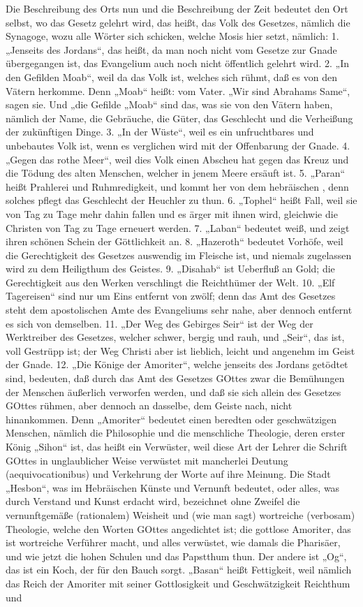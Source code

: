 Die Beschreibung des Orts nun und die Beschreibung der Zeit bedeutet den Ort selbst, wo das Gesetz gelehrt wird, das heißt, das Volk des Gesetzes, nämlich die Synagoge, wozu alle Wörter sich schicken, welche Mosis hier setzt, nämlich: 1. „Jenseits des Jordans“, das heißt, da man noch nicht vom Gesetze zur Gnade übergegangen ist, das Evangelium auch noch nicht öffentlich gelehrt wird. 2. „In den Gefilden Moab“, weil da das Volk ist, welches sich rühmt, daß es von den Vätern herkomme. Denn „Moab“ heißt: vom Vater. „Wir sind Abrahams Same“, sagen sie. Und „die Gefilde
„Moab“ sind das, was sie von den Vätern haben, nämlich der Name, die Gebräuche, die Güter, das Geschlecht und die Verheißung der zukünftigen Dinge. 3. „In der Wüste“, weil es ein unfruchtbares und unbebautes Volk ist, wenn es verglichen wird mit der Offenbarung der Gnade. 4. „Gegen das rothe Meer“, weil dies Volk einen Abscheu hat gegen das Kreuz und die Tödung des alten Menschen, welcher in jenem Meere ersäuft ist. 5. „Paran“ heißt Prahlerei und Ruhmredigkeit, und kommt her von dem hebräischen , denn solches pflegt das Geschlecht der Heuchler zu thun. 6. „Tophel“ heißt Fall, weil sie von Tag zu Tage mehr dahin fallen und es ärger mit ihnen wird, gleichwie die Christen von Tag zu Tage erneuert werden. 7. „Laban“ bedeutet weiß, und zeigt ihren schönen Schein der Göttlichkeit an. 8. „Hazeroth“ bedeutet Vorhöfe, weil die Gerechtigkeit des Gesetzes auswendig im Fleische ist, und niemals zugelassen wird zu dem Heiligthum des Geistes. 9. „Disahab“ ist Ueberfluß an Gold; die Gerechtigkeit aus den Werken verschlingt die Reichthümer der Welt. 10. „Elf Tagereisen“ sind nur um Eins entfernt von zwölf; denn das Amt des Gesetzes steht dem apostolischen Amte des Evangeliums sehr nahe, aber dennoch entfernt es sich von demselben. 11. „Der Weg des Gebirges Seir“ ist der Weg der Werktreiber des Gesetzes, welcher schwer, bergig und rauh, und „Seir“, das ist, voll Gestrüpp ist; der Weg Christi aber ist lieblich, leicht und angenehm im Geist der Gnade. 12. „Die Könige der Amoriter“, welche jenseits des Jordans getödtet sind, bedeuten, daß durch das Amt des Gesetzes GOttes zwar die Bemühungen der Menschen äußerlich verworfen werden, und daß sie sich allein des Gesetzes GOttes rühmen, aber dennoch an dasselbe, dem Geiste nach, nicht hinankommen. Denn „Amoriter“ bedeutet einen beredten oder geschwätzigen Menschen, nämlich die Philosophie und die menschliche Theologie, deren erster König „Sihon“ ist, das heißt ein Verwüster, weil diese Art der Lehrer die Schrift GOttes in unglaublicher Weise verwüstet mit mancherlei Deutung (aequivocationibus) und Verkehrung der Worte auf ihre Meinung. Die Stadt „Hesbon“, was im Hebräischen Künste und Vernunft bedeutet, oder alles, was durch Verstand und Kunst erdacht wird, bezeichnet ohne Zweifel die vernunftgemäße (rationalem) Weisheit und (wie man sagt) wortreiche (verbosam) Theologie, welche den Worten GOttes angedichtet ist; die gottlose Amoriter, das ist wortreiche Verführer macht, und alles verwüstet, wie damals die Pharisäer, und wie jetzt die hohen Schulen und das Papstthum thun. Der andere ist „Og“, das ist ein Koch, der für den Bauch sorgt. „Basan“ heißt Fettigkeit, weil nämlich das Reich der Amoriter mit seiner Gottlosigkeit und Geschwätzigkeit Reichthum und 
